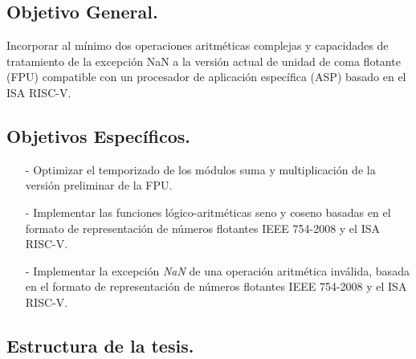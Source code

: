 \subsection{Objetivo General.}

Incorporar al mínimo dos operaciones aritméticas complejas y capacidades de tratamiento de la excepción NaN a la versión actual de unidad de coma flotante (FPU) compatible con un procesador de aplicación específica (ASP) basado en el ISA RISC-V.

\subsection{Objetivos Específicos.}

\begin{itemize}
\item[-]	Optimizar el temporizado de los módulos suma y multiplicación de la versión preliminar de la FPU.
\item[-]	Implementar las funciones lógico-aritméticas seno y coseno basadas en el formato de representación de números flotantes IEEE 754-2008 y el ISA RISC-V.
\item[-]	Implementar la excepción \textit{NaN} de una operación aritmética inválida, basada en el formato de representación de números flotantes IEEE 754-2008 y el ISA RISC-V.

\end{itemize}

\subsection{Estructura de la tesis.}





